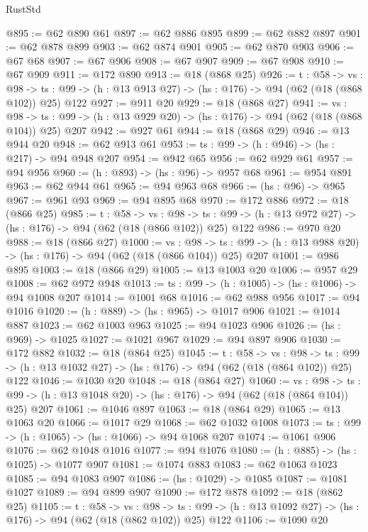 \begin{lexlean}{RustStd}
\begin{coremodule}
@895 := @62 @890 @61
@897 := @62 @886 @895
@899 := @62 @882 @897
@901 := @62 @878 @899
@903 := @62 @874 @901
@905 := @62 @870 @903
@906 := @67 @68
@907 := @67 @906
@908 := @67 @907
@909 := @67 @908
@910 := @67 @909
@911 := @172 @890
@913 := @18 (@868 @25)
@926 := {t : @58} ->
  {vs : @98} ->
  {ts : @99} -> (h : @13 @913 @27) -> (hs : @176) -> @94 (@62 (@18 (@868 @102)) @25) @122
@927 := @911 @20
@929 := @18 (@868 @27)
@941 := {vs : @98} ->
  {ts : @99} -> (h : @13 @929 @20) -> (hs : @176) -> @94 (@62 (@18 (@868 @104)) @25) @207
@942 := @927 @61
@944 := @18 (@868 @29)
@946 := @13 @944 @20
@948 := @62 @913 @61
@953 := {ts : @99} -> (h : @946) -> (hs : @217) -> @94 @948 @207
@954 := @942 @65
@956 := @62 @929 @61
@957 := @94 @956
@960 := (h : @893) -> (hs : @96) -> @957 @68
@961 := @954 @891
@963 := @62 @944 @61
@965 := @94 @963 @68
@966 := (hs : @96) -> @965
@967 := @961 @93
@969 := @94 @895 @68
@970 := @172 @886
@972 := @18 (@866 @25)
@985 := {t : @58} ->
  {vs : @98} ->
  {ts : @99} -> (h : @13 @972 @27) -> (hs : @176) -> @94 (@62 (@18 (@866 @102)) @25) @122
@986 := @970 @20
@988 := @18 (@866 @27)
@1000 := {vs : @98} ->
  {ts : @99} -> (h : @13 @988 @20) -> (hs : @176) -> @94 (@62 (@18 (@866 @104)) @25) @207
@1001 := @986 @895
@1003 := @18 (@866 @29)
@1005 := @13 @1003 @20
@1006 := @957 @29
@1008 := @62 @972 @948
@1013 := {ts : @99} -> (h : @1005) -> (hs : @1006) -> @94 @1008 @207
@1014 := @1001 @68
@1016 := @62 @988 @956
@1017 := @94 @1016
@1020 := (h : @889) -> (hs : @965) -> @1017 @906
@1021 := @1014 @887
@1023 := @62 @1003 @963
@1025 := @94 @1023 @906
@1026 := (hs : @969) -> @1025
@1027 := @1021 @967
@1029 := @94 @897 @906
@1030 := @172 @882
@1032 := @18 (@864 @25)
@1045 := {t : @58} ->
  {vs : @98} ->
  {ts : @99} -> (h : @13 @1032 @27) -> (hs : @176) -> @94 (@62 (@18 (@864 @102)) @25) @122
@1046 := @1030 @20
@1048 := @18 (@864 @27)
@1060 := {vs : @98} ->
  {ts : @99} -> (h : @13 @1048 @20) -> (hs : @176) -> @94 (@62 (@18 (@864 @104)) @25) @207
@1061 := @1046 @897
@1063 := @18 (@864 @29)
@1065 := @13 @1063 @20
@1066 := @1017 @29
@1068 := @62 @1032 @1008
@1073 := {ts : @99} -> (h : @1065) -> (hs : @1066) -> @94 @1068 @207
@1074 := @1061 @906
@1076 := @62 @1048 @1016
@1077 := @94 @1076
@1080 := (h : @885) -> (hs : @1025) -> @1077 @907
@1081 := @1074 @883
@1083 := @62 @1063 @1023
@1085 := @94 @1083 @907
@1086 := (hs : @1029) -> @1085
@1087 := @1081 @1027
@1089 := @94 @899 @907
@1090 := @172 @878
@1092 := @18 (@862 @25)
@1105 := {t : @58} ->
  {vs : @98} ->
  {ts : @99} -> (h : @13 @1092 @27) -> (hs : @176) -> @94 (@62 (@18 (@862 @102)) @25) @122
@1106 := @1090 @20

\end{coremodule}
\end{lexlean}
